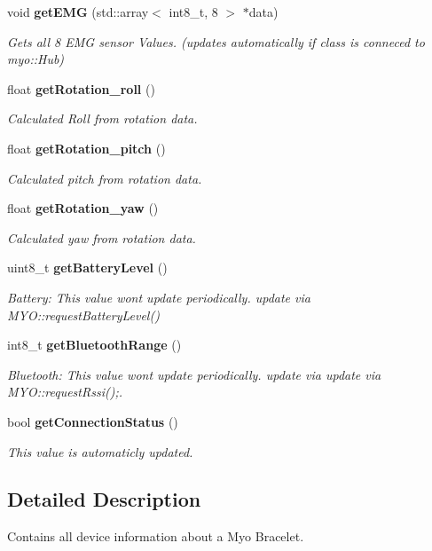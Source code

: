 \begin{DoxyCompactItemize}
void \textbf{ get\+E\+MG} (std\+::array$<$ int8\+\_\+t, 8 $>$ $\ast$data)
\begin{DoxyCompactList}\small\item\em Gets all 8 E\+MG sensor Values. (updates automatically if class is conneced to myo\+::\+Hub) \end{DoxyCompactList}\item 
float \textbf{ get\+Rotation\+\_\+roll} ()
\begin{DoxyCompactList}\small\item\em Calculated Roll from rotation data. \end{DoxyCompactList}\item 
float \textbf{ get\+Rotation\+\_\+pitch} ()
\begin{DoxyCompactList}\small\item\em Calculated pitch from rotation data. \end{DoxyCompactList}\item 
float \textbf{ get\+Rotation\+\_\+yaw} ()
\begin{DoxyCompactList}\small\item\em Calculated yaw from rotation data. \end{DoxyCompactList}\item 
uint8\+\_\+t \textbf{ get\+Battery\+Level} ()
\begin{DoxyCompactList}\small\item\em Battery\+: This value wont update periodically. update via M\+Y\+O\+::request\+Battery\+Level() \end{DoxyCompactList}\item 
int8\+\_\+t \textbf{ get\+Bluetooth\+Range} ()
\begin{DoxyCompactList}\small\item\em Bluetooth\+: This value wont update periodically. update via update via M\+Y\+O\+::request\+Rssi();. \end{DoxyCompactList}\item 
bool \textbf{ get\+Connection\+Status} ()
\begin{DoxyCompactList}\small\item\em This value is automaticly updated. \end{DoxyCompactList}\end{DoxyCompactItemize}


\subsection{Detailed Description}
Contains all device information about a Myo Bracelet. 

